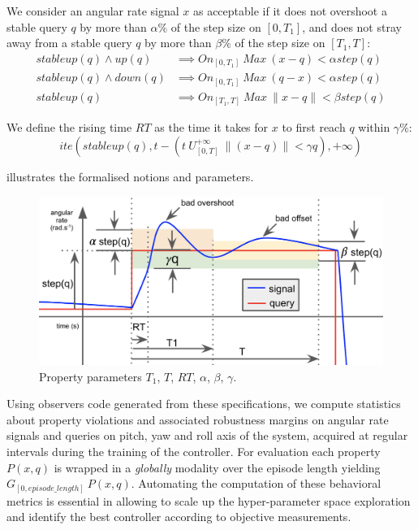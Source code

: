 \documentclass[anonymous=true,format=sigconf, screen=true, review=false]{acmart}
\newcommand{\becomesstable}[0]{\mathit{stableup}}
\newcommand{\up}[0]{\mathit{up}}
\newcommand{\down}[0]{\mathit{down}}
\newcommand{\ite}[0]{\mathit{ite}}
\newcommand{\On}[0]{\mathit{On}}
\newcommand{\MaxAgg}[0]{\mathit{Max}}
\newcommand{\stepSize}[0]{\mathit{step}}
\begin{document}
We consider an angular rate signal $x$ as acceptable if it does not overshoot a stable query $q$ 
by more than $\alpha\%$ of the step size on $[0, T_1]$, and does not stray away from a stable query $q$ 
by more than $\beta\%$ of the step size on $[T_1,T]$:
\begin{align}
\becomesstable(q) \land \up(q)   &\implies \On_{[0, T_1]} ~ \MaxAgg ~  (x - q)  < \alpha \stepSize(q) 
\label{eq:overshootup} \\
\becomesstable(q) \land \down(q) &\implies \On_{[0, T_1]} ~ \MaxAgg ~  (q - x)  < \alpha \stepSize(q) 
\label{eq:overshootdown}\\
\becomesstable(q)                &\implies \On_{[T_1, T]} ~ \MaxAgg ~ \|x - q\| < \beta \stepSize(q)
\label{eq:offset}
\end{align}

We define the rising time $\mathit{RT}$ as the time it takes for $x$ to first reach $q$ within $\gamma\%$:
\begin{equation}
\ite(\becomesstable(q),  t - (t ~ U_{[0,T]}^{+\infty} ~ \|(x-q)\| < \gamma q), +\infty)
\label{eq:rising}
\end{equation}

 illustrates the formalised notions and parameters.
\begin{figure}[htbp]
    \centering
    \includegraphics[width=\linewidth]{observer-params}
    \caption{Property parameters $T_1$, $T$, $RT$, $\alpha$, $\beta$, $\gamma$.}
    \label{fig:observer-params}
\end{figure}

Using observers code generated from these specifications, we compute statistics about property violations 
and associated robustness margins on angular rate signals and queries on pitch, yaw and roll axis of the system, 
acquired at regular intervals during the training of the controller. For evaluation each property $P(x,q)$ is wrapped 
in a \emph{globally} modality over the episode length yielding $G_{[0,\mathit{episode\_length}]} ~ P(x,q)$.
Automating the computation of these behavioral metrics is essential in allowing to scale up the hyper-parameter
space exploration and identify the best controller according to objective measurements. 
\end{document}
